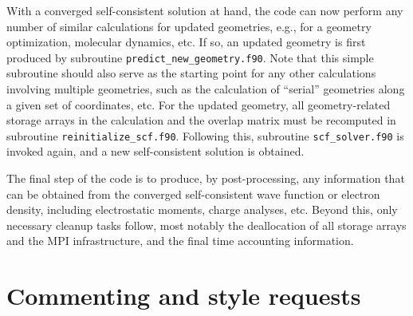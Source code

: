With a converged self-consistent solution at hand, the code can now
perform any number of similar calculations for updated geometries,
e.g., for a geometry optimization, molecular dynamics, etc. If so, an
updated geometry is first produced by subroutine
\texttt{predict\_new\_geometry.f90}. Note that this simple subroutine
should also serve as the starting point for any other calculations
involving multiple geometries, such as the calculation of ``serial''
geometries along a given set of coordinates, etc. For the updated
geometry, all geometry-related storage arrays in the calculation and
the overlap matrix must be recomputed in subroutine
\texttt{reinitialize\_scf.f90}. Following this, subroutine
\texttt{scf\_solver.f90} is invoked again, and a new self-consistent
solution is obtained. 

The final step of the code is to produce, by post-processing, any
information that can be obtained from the converged self-consistent
wave function or electron density, including electrostatic moments,
charge analyses, etc. Beyond this, only necessary cleanup tasks
follow, most notably the deallocation of all storage arrays and the
MPI infrastructure, and the final time accounting information. 

\section{Commenting and style requests}

